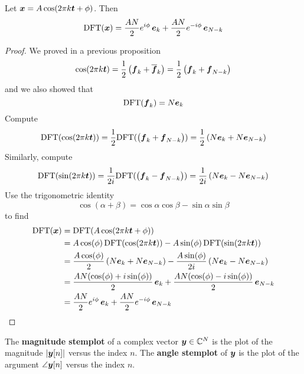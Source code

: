 \begin{proposition}
Let $\boldsymbol{x} = A \cos(2 \pi k \boldsymbol{t} + \phi)$. Then
$$
\mathrm{DFT}(\boldsymbol{x}) = \frac{AN}{2} e^{i \phi} \, \boldsymbol{e}_k + \frac{AN}{2} e^{-i \phi} \, \boldsymbol{e}_{N-k}
$$

\begin{proof}
We proved in a previous proposition
$$
\cos(2 \pi k \boldsymbol{t} ) = \frac{1}{2} \left( \boldsymbol{f}_k + \overline{\boldsymbol{f}}_k \right) = \frac{1}{2} \left( \boldsymbol{f}_k + \boldsymbol{f}_{N-k} \right)
$$
and we also showed that
$$
\mathrm{DFT}( \boldsymbol{f}_k ) = N \boldsymbol{e}_k
$$
Compute
$$
\mathrm{DFT}(\cos(2 \pi k \boldsymbol{t} )) = \frac{1}{2} \mathrm{DFT}(\left( \boldsymbol{f}_k + \boldsymbol{f}_{N-k} \right)) = \frac{1}{2} \left( N\boldsymbol{e}_k + N \boldsymbol{e}_{N-k} \right)
$$
Similarly, compute
$$
\mathrm{DFT}(\sin(2 \pi k \boldsymbol{t} )) = \frac{1}{2i} \mathrm{DFT}(\left( \boldsymbol{f}_k - \boldsymbol{f}_{N-k} \right)) = \frac{1}{2i} \left( N\boldsymbol{e}_k - N \boldsymbol{e}_{N-k} \right)
$$
Use the trigonometric identity
$$
\cos(\alpha + \beta) = \cos \alpha \cos \beta - \sin \alpha \sin \beta
$$
to find
\begin{align*}
\mathrm{DFT}(\boldsymbol{x}) &= \mathrm{DFT}(A \cos(2 \pi k \boldsymbol{t} + \phi)) \\
&= A \cos(\phi) \, \mathrm{DFT}(\cos(2 \pi k \boldsymbol{t}))  - A  \sin(\phi) \, \mathrm{DFT}(\sin(2 \pi k \boldsymbol{t})) \\
&= \frac{A \cos(\phi)}{2} \left( N\boldsymbol{e}_k + N \boldsymbol{e}_{N-k} \right) - \frac{A \sin(\phi)}{2i} \left( N\boldsymbol{e}_k - N \boldsymbol{e}_{N-k} \right) \\
&= \frac{AN ( \cos(\phi) + i \sin(\phi) )}{2} \, \boldsymbol{e}_k + \frac{AN (\cos(\phi) - i\sin(\phi))}{2} \, \boldsymbol{e}_{N-k} \\
&= \frac{AN}{2} e^{i \phi} \, \boldsymbol{e}_k + \frac{AN}{2} e^{-i \phi} \, \boldsymbol{e}_{N-k}
\end{align*}
\end{proof}
\end{proposition}

\begin{definition}
The {\bf magnitude stemplot} of a complex vector $\boldsymbol{y} \in \mathbb{C}^N$ is the plot of the magnitude $| \boldsymbol{y}[n] |$ versus the index $n$. The {\bf angle stemplot} of $\boldsymbol{y}$ is the plot of the argument $\angle \boldsymbol{y}[n]$ versus the index $n$.
\end{definition}

